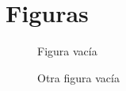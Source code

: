 \chapter{Figuras}

\vspace*{-3in}

\begin{figure}
\vspace{2.4in}
\caption{Figura vacía}
\label{arm:fig1}
\end{figure}
\clearpage
\newpage

\begin{figure}
\vspace{2.4in}
\caption{Otra figura vacía}
\label{arm:fig2}
\end{figure}
\clearpage
\newpage
